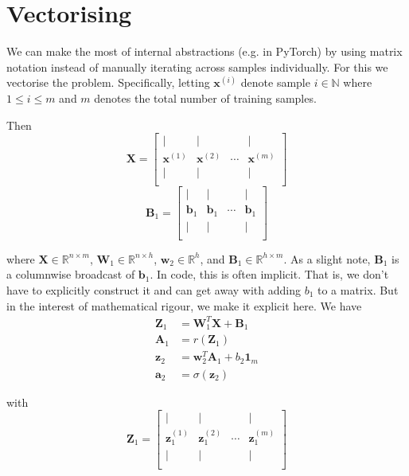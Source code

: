 \documentclass[varwidth,border=2cm]{standalone}
\begin{document}
\section{Vectorising}

We can make the most of internal abstractions (e.g. in PyTorch) by using matrix notation instead of manually iterating across samples individually. For this we vectorise the problem. Specifically, letting $\bm x ^{(i)}$ denote sample $i \in \mathbb{N}$ where $1 \le i \le m$ and $m$ denotes the total number of training samples.

Then
$$
\bm X = 
\left[
\begin{array}{cccc}
| & | &        & | \\
\bm{x}^{(1)} & \bm{x}^{(2)} & \cdots & \bm{x}^{(m)} \\
| & | &        & | \\
\end{array}
\right]
$$
$$
\bm B_1 =  
\left[
\begin{array}{cccc}
| & | &        & | \\
\bm{b}_1 & \bm{b}_1 & \cdots & \bm{b}_1 \\
| & | &        & | \\
\end{array}
\right]
$$

where $\bm X \in \mathbb{R}^{n \times m}$, $\bm W_1 \in \mathbb{R}^{n \times h}$, $\bm w_2 \in \mathbb{R}^{h}$, and $\bm B_1 \in \mathbb{R}^{h\times m}$. As a slight note, $\bm B_1$ is a columnwise broadcast of $\bm b_1$. In code, this is often implicit. That is, we don't have to explicitly construct it and can get away with adding $b_1$ to a matrix. But in the interest of mathematical rigour, we make it explicit here. We have
\begin{align}
\bm Z_1 &= \bm W_1^T \bm X + \bm B_1 \\
\bm A_1 &= r(\bm Z_1) \nonumber\\
\bm z_2 &= \bm w_2 ^T \bm A_1 + b_2\bm 1_m \nonumber \\
\bm a_2 &= \sigma(\bm z_2) \nonumber
\end{align}

with
$$
\bm Z_1 =  
\left[
\begin{array}{cccc}
| & | &        & | \\
\bm{z}_1^{(1)} & \bm{z}_1^{(2)} & \cdots & \bm{z}_1^{(m)} \\
| & | &        & | \\
\end{array}
\right]
$$
\end{document}
